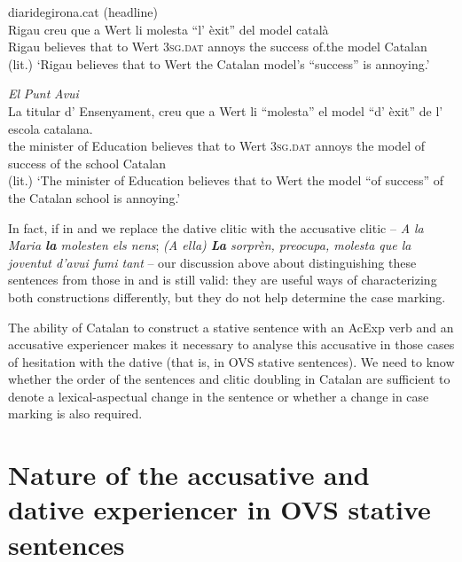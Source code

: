 \documentclass[output=paper,colorlinks,citecolor=brown,modfonts,nonflat]{langsci/langscibook}
\begin{document}
 \ex diaridegirona.cat (headline)\\
 \gll Rigau creu que a Wert li molesta “l’ èxit” del model català\\
Rigau believes that to Wert \textsc{3sg.dat} annoys   the success of.the model Catalan \\
 \glt (lit.) ‘Rigau believes that to Wert the Catalan model’s “success” is annoying.’

 \ex \emph{El} \emph{Punt} \emph{Avui}\\
 \gll La titular d’ Ensenyament, creu que a Wert li “molesta” el model “d’ èxit” de l’ escola catalana.\\
 the minister of Education believes that to Wert \textsc{3sg.dat} annoys the model of success of the school Catalan\\
 \glt (lit.) ‘The minister of Education believes that to Wert the model “of success” of the Catalan school
is annoying.’
 \z
 \z


In fact, if in  and  we replace the dative clitic with the accusative clitic – \textit{A la Maria \textbf{la} molesten els nens}; \textit{(A ella) \textbf{La }sorprèn, preocupa, molesta que la joventut d’avui fumi tant} – our discussion above about distinguishing these sentences from those in  and  is still valid: they are useful ways of characterizing both constructions differently, but they do not help determine the case marking.

The ability of Catalan to construct a stative sentence with an AcExp verb and an accusative experiencer makes it necessary to analyse this accusative in those cases of hesitation with the dative (that is, in OVS stative sentences). We need to know whether the order of the sentences and clitic doubling in Catalan are sufficient to denote a lexical-aspectual change in the sentence or whether a change in case marking is also required.


\section{Nature of the accusative and dative experiencer in OVS stative sentences}\label{sec:royo:3}
\end{document}
